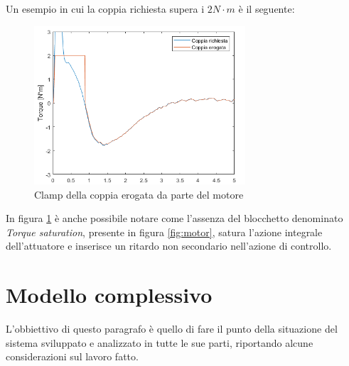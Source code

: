 Un esempio in cui la coppia richiesta supera i $2N\cdot{m}$ è il seguente:
\begin{figure}[H]
	\centering   	
	\includegraphics[width=0.7\textwidth]{Immagini/saturazione.png}
	\caption{Clamp della coppia erogata da parte del motore}
	\label{fig:clamp_motore}
\end{figure}
In figura \ref{fig:clamp_motore} è anche possibile notare come l'assenza del blocchetto denominato \textit{Torque saturation}, presente in figura \ref{fig:motor}, satura l'azione integrale dell'attuatore e inserisce un ritardo non secondario nell'azione di controllo.

\section{Modello complessivo}
L'obbiettivo di questo paragrafo è quello di fare il punto della situazione del sistema sviluppato e analizzato in tutte le sue parti, riportando alcune considerazioni sul lavoro fatto.

